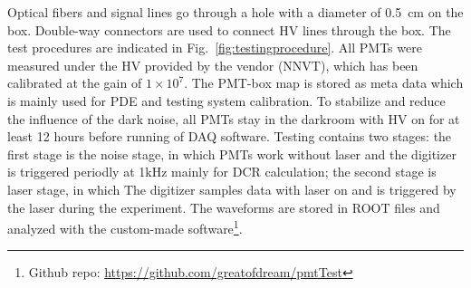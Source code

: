  Optical fibers and signal lines go through a hole with a diameter of \SI{0.5}{cm} on the box. Double-way connectors are used to connect HV lines through the box.
 The test procedures are indicated in Fig.~\ref{fig:testingprocedure}. All PMTs were measured under the HV provided by the vendor (NNVT), which has been calibrated at the gain of $1\times10^7$. 
The PMT-box map is stored as meta data which is mainly used for PDE and testing system calibration. To stabilize and reduce the influence of the dark noise, all PMTs stay in the darkroom with HV on for at least 12 hours before running of DAQ software. Testing contains two stages: the first stage is the noise stage, in which PMTs work without laser and the digitizer is triggered periodly at 1kHz mainly for DCR calculation; the second stage is laser stage, in which 
The digitizer samples data with laser on and is triggered by the laser during the experiment. The waveforms are stored in ROOT files and analyzed with the custom-made software\footnote{Github repo: \url{https://github.com/greatofdream/pmtTest}}.